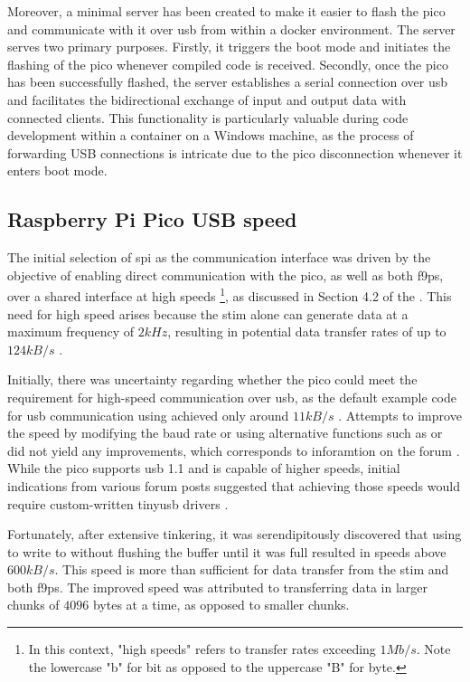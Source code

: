 Moreover, a minimal \py server has been created to make it easier to flash the \gls{pico} and communicate with it over \gls{usb} from within a \gls{docker} environment.
The server serves two primary purposes.
Firstly, it triggers the boot mode and initiates the flashing of the \gls{pico} whenever compiled code is received.
Secondly, once the \gls{pico} has been successfully flashed, the server establishes a serial connection over \gls{usb} and facilitates the bidirectional exchange of input and output data with connected clients.
This functionality is particularly valuable during code development within a container on a Windows machine, as the process of forwarding USB connections is intricate due to the \gls{pico} disconnection whenever it enters boot mode.


\subsection{Raspberry Pi Pico USB speed}

The initial selection of \gls{spi} as the communication interface was driven by the objective of enabling direct communication with the \gls{pico}, as well as both \glspl{f9p}, over a shared interface at high speeds \footnote{In this context, "high speeds" refers to transfer rates exceeding $1Mb/s$.
    Note the lowercase "b" for bit as opposed to the uppercase "B" for byte.}, as discussed in Section 4.2 of the \preproject.
This need for high speed arises because the \gls{stim} alone can generate data at a maximum frequency of $2kHz$, resulting in potential data transfer rates of up to $124kB/s$ \cite[34]{safranSTIM300Datasheet}.

Initially, there was uncertainty regarding whether the \gls{pico} could meet the requirement for high-speed communication over \gls{usb}, as the default example code for \gls{usb} communication using  achieved only around $11kB/s$ \cite[usb/device]{RaspberryPiPico2023}.
Attempts to improve the speed by modifying the baud rate or using alternative functions such as  or  did not yield any improvements, which corresponds to inforamtion on the forum \cite{hippyAnswerSettingUsb2021}.
While the \gls{pico} supports \gls{usb} 1.1 and is capable of higher speeds, initial indications from various forum posts suggested that achieving those speeds would require custom-written \gls{tinyusb} drivers \cite[usb/device]{RaspberryPiPico2023}.

Fortunately, after extensive tinkering, it was serendipitously discovered that using  to write to  without flushing the buffer until it was full resulted in speeds above $600kB/s$.
This speed is more than sufficient for data transfer from the \gls{stim} and both \glspl{f9p}.
The improved speed was attributed to transferring data in larger chunks of $4096$ bytes at a time, as opposed to smaller chunks.





